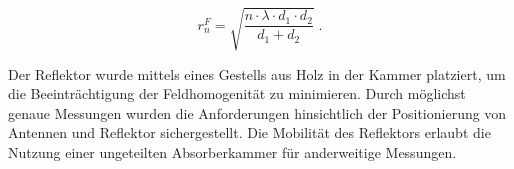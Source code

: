 \begin{equation}
    r^F_n = \sqrt{\frac{n\cdot \lambda\cdot d_1 \cdot d_2}{d_1 + d_2}}\; \text{.}
    \label{Fresnelzone}
\end{equation}

\par
\vspace{\linespace}
Der Reflektor wurde mittels eines Gestells aus Holz in der Kammer platziert, um die Beeinträchtigung der Feldhomogenität zu minimieren. Durch möglichst genaue Messungen wurden die Anforderungen hinsichtlich der Positionierung von Antennen und Reflektor sichergestellt. Die Mobilität des Reflektors erlaubt die Nutzung einer ungeteilten Absorberkammer für anderweitige Messungen.
\par
\vspace{\linespace}

